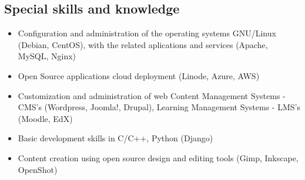 \documentclass[overlapped,line,final]{res}
\begin{document}
\begin{resume}
\vspace{0.25cm}

\section{\sc Special skills and knowledge}
\vspace{0.5cm}
\begin{itemize}
	\item Configuration and administration of the operating systems GNU/Linux (Debian, CentOS), with the related aplications and services (Apache, MySQL, Nginx)
	\item Open Source applications cloud deployment (Linode, Azure, AWS) 
	\item Customization and administration of web Content Management Systems - CMS's (Wordpress, Joomla!, Drupal), Learning Management Systems - LMS's (Moodle, EdX)
	\item Basic development skills in C/C++, Python (Django)
 	\item Content creation using open source design and editing tools (Gimp, Inkscape, OpenShot)
\end{itemize}


\end{resume}
\end{document}
